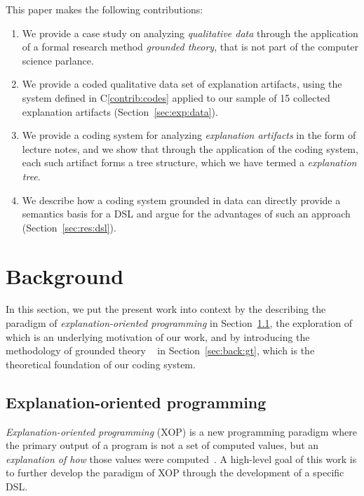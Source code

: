 \documentclass[sigconf]{acmart}
\begin{document}
This paper makes the following contributions:
%
\begin{enumerate}[C1.]

\item \label{contrib:method}
  We provide a case study on analyzing \emph{qualitative data} through the
  application of a formal research method \emph{grounded theory}, that is not
  part of the computer science parlance.

\item \label{contrib:data}
%
We provide a coded qualitative data set of explanation artifacts, using the
system defined in C\ref{contrib:codes} applied to our sample of 15 collected
explanation artifacts (Section~\ref{sec:exp:data}).

\item \label{contrib:codes}
%
We provide a coding system for analyzing \emph{explanation artifacts} in the
form of lecture notes, and we show that through the application of the coding
system, each such artifact forms a tree structure, which we have termed a
\emph{explanation tree}.


\item \label{contrib:dsl}
%
  We describe how a coding system grounded in data can directly provide a
  semantics basis for a DSL and argue for the advantages of such an approach
  (Section~\ref{sec:res:dsl}).
%
\end{enumerate}

\noindent

\section{Background}
\label{sec:back}

In this section, we put the present work into context by the describing the
paradigm of \emph{explanation-oriented programming} in
Section~\ref{sec:back:xop}, the exploration of which is an underlying
motivation of our work, and by introducing the methodology of grounded theory
~\cite{Strauss67discoveryof} in Section~\ref{sec:back:gt}, which is the
theoretical foundation of our coding system.

\subsection{Explanation-oriented programming}
\label{sec:back:xop}

\emph{Explanation-oriented programming} (XOP) is a new programming paradigm
where the primary output of a program is not a set of computed values, but an
\emph{explanation of how} those values were
computed~\cite{EW08vl,EW09dsl,EW09vl,WE11dsl,EW13jvlc}.
%
A high-level goal of this work is to further develop the paradigm of XOP
through the development of a specific DSL.
\end{document}
